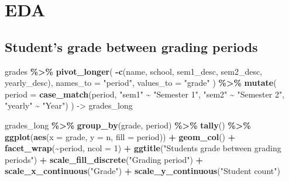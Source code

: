 \documentclass[
]{article}
\newenvironment{Shaded}{\begin{snugshade}}{\end{snugshade}}
\newcommand{\AttributeTok}[1]{\textcolor[rgb]{0.13,0.29,0.53}{#1}}
\newcommand{\DecValTok}[1]{\textcolor[rgb]{0.00,0.00,0.81}{#1}}
\newcommand{\FunctionTok}[1]{\textcolor[rgb]{0.13,0.29,0.53}{\textbf{#1}}}
\newcommand{\NormalTok}[1]{#1}
\newcommand{\OtherTok}[1]{\textcolor[rgb]{0.56,0.35,0.01}{#1}}
\newcommand{\SpecialCharTok}[1]{\textcolor[rgb]{0.81,0.36,0.00}{\textbf{#1}}}
\newcommand{\StringTok}[1]{\textcolor[rgb]{0.31,0.60,0.02}{#1}}
\begin{document}
\hypertarget{eda}{%
\section{EDA}\label{eda}}

\hypertarget{students-grade-between-grading-periods}{%
\subsection{Student's grade between grading
periods}\label{students-grade-between-grading-periods}}

\begin{Shaded}
\begin{Highlighting}[]
\NormalTok{grades }\SpecialCharTok{\%\textgreater{}\%}
  \FunctionTok{pivot\_longer}\NormalTok{(}
    \SpecialCharTok{{-}}\FunctionTok{c}\NormalTok{(name, school, sem1\_desc, sem2\_desc, yearly\_desc),}
    \AttributeTok{names\_to =} \StringTok{"period"}\NormalTok{, }\AttributeTok{values\_to =} \StringTok{"grade"}
\NormalTok{  ) }\SpecialCharTok{\%\textgreater{}\%} \FunctionTok{mutate}\NormalTok{(}
    \AttributeTok{period =} \FunctionTok{case\_match}\NormalTok{(period, }\StringTok{"sem1"} \SpecialCharTok{\textasciitilde{}} \StringTok{"Semester 1"}\NormalTok{, }\StringTok{"sem2"} \SpecialCharTok{\textasciitilde{}} \StringTok{"Semester 2"}\NormalTok{, }\StringTok{"yearly"} \SpecialCharTok{\textasciitilde{}} \StringTok{"Year"}\NormalTok{)}
\NormalTok{  ) }\OtherTok{{-}\textgreater{}}\NormalTok{ grades\_long}

\NormalTok{grades\_long }\SpecialCharTok{\%\textgreater{}\%}
  \FunctionTok{group\_by}\NormalTok{(grade, period) }\SpecialCharTok{\%\textgreater{}\%}
  \FunctionTok{tally}\NormalTok{() }\SpecialCharTok{\%\textgreater{}\%}
  \FunctionTok{ggplot}\NormalTok{(}\FunctionTok{aes}\NormalTok{(}\AttributeTok{x =}\NormalTok{ grade, }\AttributeTok{y =}\NormalTok{ n, }\AttributeTok{fill =}\NormalTok{ period)) }\SpecialCharTok{+}
  \FunctionTok{geom\_col}\NormalTok{() }\SpecialCharTok{+}
  \FunctionTok{facet\_wrap}\NormalTok{(}\SpecialCharTok{\textasciitilde{}}\NormalTok{period, }\AttributeTok{ncol =} \DecValTok{1}\NormalTok{) }\SpecialCharTok{+} 
  \FunctionTok{ggtitle}\NormalTok{(}\StringTok{"Student\textquotesingle{}s grade between grading periods"}\NormalTok{) }\SpecialCharTok{+} 
  \FunctionTok{scale\_fill\_discrete}\NormalTok{(}\StringTok{"Grading period"}\NormalTok{) }\SpecialCharTok{+} 
  \FunctionTok{scale\_x\_continuous}\NormalTok{(}\StringTok{"Grade"}\NormalTok{) }\SpecialCharTok{+} 
  \FunctionTok{scale\_y\_continuous}\NormalTok{(}\StringTok{"Student count"}\NormalTok{)}
\end{Highlighting}
\end{Shaded}
\end{document}
